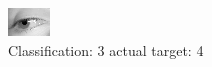 \begin{figure}[h!]
\begin{center}
\includegraphics[width=0.60\columnwidth]{figures/ID3011_class_3_target_4.png}
\end{center}
\caption{ Classification: 3 actual target: 4}
\label{fig:ID3011_class_3_target_4}
\end{figure}
